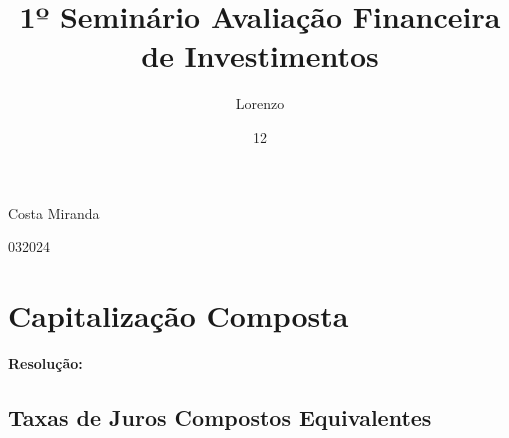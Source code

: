 \documentclass[report]{uftex}
\newcommand\uftex{UF\TeX}
\begin{document}
  \title{1º Seminário Avaliação Financeira de Investimentos}
  \author{Lorenzo}{Costa Miranda}
  \date{12}{03}{2024}
  \keyword{\LaTeX}
  \keyword{\uftex}
  \foreignkeyword{\LaTeX}
  \foreignkeyword{\uftex}
  \maketitle

  \frontmatter

  \printlosymbols  
  \printloabbreviations
 
\mainmatter
\onehalfspacing

\chapter{Capitalização Composta}

\large \textbf{Resolução:}

\section{Taxas de Juros Compostos Equivalentes}
\end{document}
